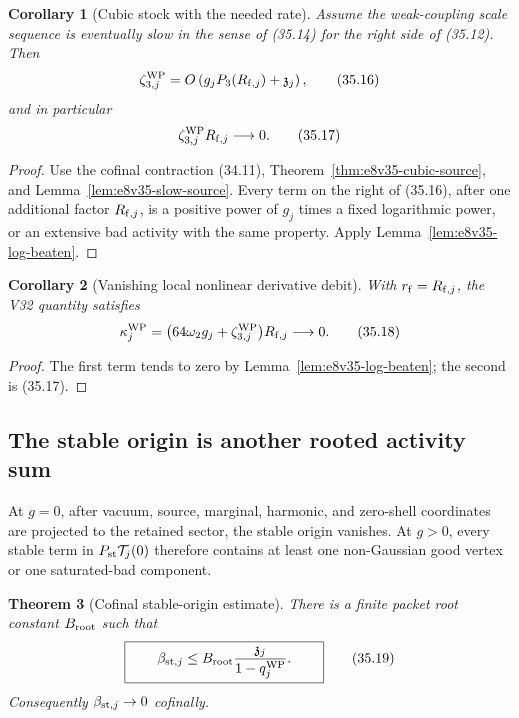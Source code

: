 \documentclass[11pt,oneside]{book}
\newtheorem{theorem}{Theorem}[chapter]
\newtheorem{corollary}[theorem]{Corollary}
\theoremstyle{definition}
\theoremstyle{remark}
\begin{document}
\begin{corollary}[Cubic stock with the needed rate]
\label{cor:e8v35-cubic-rate}
Assume the weak-coupling scale sequence is eventually slow in the
sense of (35.14) for the right side of (35.12).  Then
\[
 \zeta_{3,j}^{\rm WP}=O\left(
 g_jP_3(R_{{\rm f},j})+{\mathfrak z}_j
 \right),                                                       \tag{35.16}
\]
and in particular
\[
 \zeta_{3,j}^{\rm WP}R_{{\rm f},j}\longrightarrow0.             \tag{35.17}
\]
\end{corollary}

\begin{proof}
Use the cofinal contraction (34.11),
Theorem~\ref{thm:e8v35-cubic-source}, and
Lemma~\ref{lem:e8v35-slow-source}.  Every term on the right of
(35.16), after one additional factor \(R_{{\rm f},j}\), is a positive
power of \(g_j\) times a fixed logarithmic power, or an extensive bad
activity with the same property.  Apply
Lemma~\ref{lem:e8v35-log-beaten}.
\end{proof}

\begin{corollary}[Vanishing local nonlinear derivative debit]
\label{cor:e8v35-kappa}
With \(r_{\rm f}=R_{{\rm f},j}\), the V32 quantity satisfies
\[
 \kappa_j^{\rm WP}
 =
 \bigl(64\omega_2g_j+\zeta_{3,j}^{\rm WP}\bigr)
 R_{{\rm f},j}
 \longrightarrow0.                                              \tag{35.18}
\]
\end{corollary}

\begin{proof}
The first term tends to zero by
Lemma~\ref{lem:e8v35-log-beaten}; the second is (35.17).
\end{proof}

\subsection{The stable origin is another rooted activity sum}

At \(g=0\), after vacuum, source, marginal, harmonic, and zero-shell
coordinates are projected to the retained sector, the stable origin
vanishes.  At \(g>0\), every stable term in
\(P_{\rm st}{\cal T}_j(0)\) therefore contains at least one
non-Gaussian good vertex or one saturated-bad component.

\begin{theorem}[Cofinal stable-origin estimate]
\label{thm:e8v35-origin}
There is a finite packet root constant \(B_{\rm root}\) such that
\[
\boxed{\qquad
 \beta_{{\rm st},j}
 \leq
 B_{\rm root}
 \frac{{\mathfrak z}_j}{1-q_j^{\rm WP}}.
\qquad}                                                         \tag{35.19}
\]
Consequently \(\beta_{{\rm st},j}\to0\) cofinally.
\end{theorem}
\end{document}

